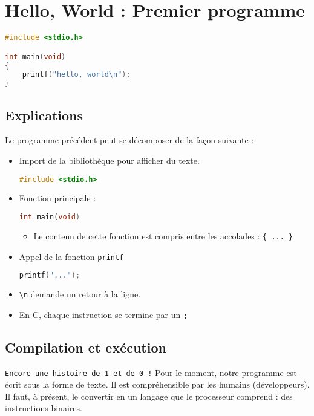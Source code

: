 
\section{Hello, World : Premier programme}

\begin{lstlisting}[language=c]
#include <stdio.h>

int main(void)
{
    printf("hello, world\n");
}
\end{lstlisting}

\subsection{Explications}
Le programme précédent peut se décomposer de la façon suivante :

\begin{itemize}
	\item Import de la bibliothèque pour afficher du texte.
	      \begin{lstlisting}[language=c]
#include <stdio.h>
\end{lstlisting}
\end{itemize}

\begin{itemize}
	\item Fonction principale :
	      \begin{lstlisting}[language=c]
int main(void)
\end{lstlisting}
	      \begin{itemize}
		      \item Le contenu de cette fonction est compris entre les accolades : \texttt{\{ ... \}}
	      \end{itemize}
\end{itemize}

\begin{itemize}
	\item Appel de la fonction \texttt{printf}
	      \begin{lstlisting}[language=c]
printf("...");  
\end{lstlisting}
	\item \texttt{\textbackslash n} demande un retour à la ligne.
	\item En C, chaque instruction se termine par un \texttt{;}
\end{itemize}

\subsection{Compilation et exécution}
\texttt{Encore une histoire de 1 et de 0 !}
Pour le moment, notre programme est écrit sous la forme de texte. Il est compréhensible par les humains (développeurs). Il faut, à présent, le convertir en un langage que le processeur comprend : des instructions binaires.

